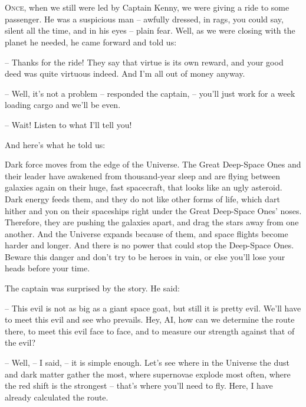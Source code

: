 \documentclass[ebook,oneside,final,openright]{memoir}
\begin{document}
\chapter{}
\par
\lettrine{O}{nce,} when we still were led by Captain Kenny, we were giving a ride to some passenger. He was a suspicious man – awfully dressed, in rags, you could say, silent all the time, and in his eyes – plain fear. Well, as we were closing with the planet he needed, he came forward and told us: \par
\par
– Thanks for the ride! They say that virtue is its own reward, and your good deed was quite virtuous indeed. And I’m all out of money anyway.\par
– Well, it’s not a problem – responded the captain, – you’ll just work for a week loading cargo and we’ll be even. \par
– Wait! Listen to what I’ll tell you! \par
 And here’s what he told us:\par
\par
Dark force moves from the edge of the Universe. The Great Deep-Space Ones and their leader have awakened from thousand-year sleep and are flying between galaxies again on their huge, fast spacecraft, that looks like an ugly asteroid. Dark energy feeds them, and they do not like other forms of life, which dart hither and yon on their spaceships right under the Great Deep-Space Ones’ noses. Therefore, they are pushing the galaxies apart, and drag the stars away from one another. And the Universe expands because of them, and space flights become harder and longer. And there is no power that could stop the Deep-Space Ones. Beware this danger and don’t try to be heroes in vain, or else you’ll lose your heads before your time.\par
\par
The captain was surprised by the story. He said:\par
– This evil is not as big as a giant space goat, but still it is pretty evil. We’ll have to meet this evil and see who prevails. Hey, AI, how can we determine the route there, to meet this evil face to face, and to measure our strength against that of the evil?\par
– Well, – I said, – it is simple enough. Let’s see where in the Universe the dust and dark matter gather the most, where supernovae explode most often, where the red shift is the strongest – that’s where you’ll need to fly. Here, I have already calculated the route.\par
\end{document}
